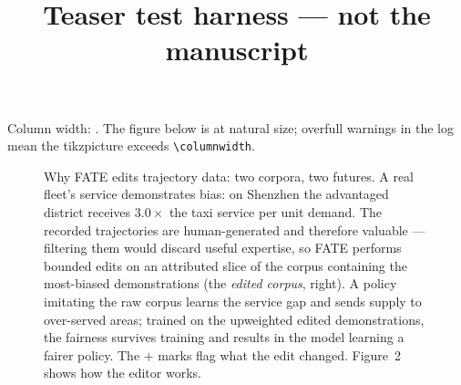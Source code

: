 \documentclass[sigconf,review,anonymous]{acmart}
\begin{document}
\title{Teaser test harness --- not the manuscript}
\maketitle

\noindent Column width: \the\columnwidth. The figure below is at natural
size; overfull warnings in the log mean the tikzpicture exceeds
\verb|\columnwidth|.

\begin{figure}[h]
  \centering
  
  \caption{Why FATE edits trajectory data: two corpora, two futures.
  A real fleet's service demonstrates bias: on Shenzhen the advantaged
  district receives $3.0\times$ the taxi service per unit demand.
  The recorded trajectories are human-generated and therefore valuable
  --- filtering them would discard useful expertise, so FATE performs
  bounded edits on an attributed slice of the corpus containing the
  most-biased demonstrations (the \emph{edited corpus}, right).
  A policy imitating the raw corpus learns the service gap
  and sends supply to over-served areas; trained
  on the upweighted edited demonstrations, the fairness survives training
  and results in the model learning a fairer policy. The $+$ marks flag
  what the edit changed. Figure~2 shows how the editor works.}
\end{figure}
\end{document}
